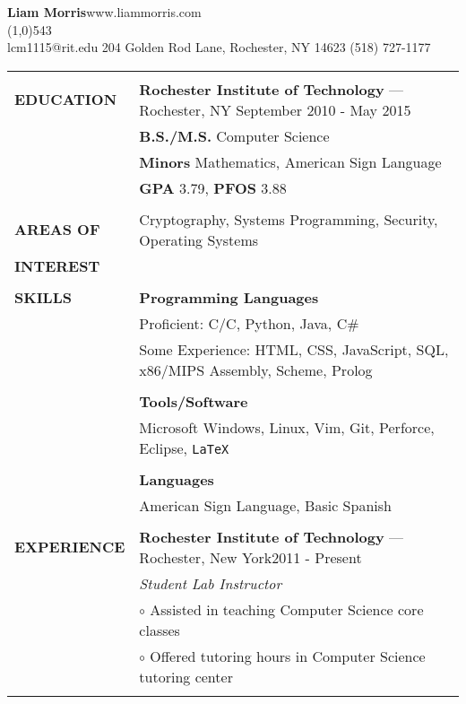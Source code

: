 \documentclass[10pt,letterpaper]{article}
\newcommand{\CPP}
{C\nolinebreak[4]\hspace{-.05em}\raisebox{.22ex}{\footnotesize\bf ++}}
\begin{document}
\raggedright

\textbf{\huge{Liam Morris}}\hfill www.liammorris.com\\
\vspace{-8pt}
\line(1,0){543}\\
lcm1115@rit.edu \hfill 204 Golden Rod Lane, Rochester, NY 14623 \hfill (518)
727-1177\\
\vspace{5pt}

\begin{tabular}{@{}lp{6.6in}}
&\\
\textbf{EDUCATION}
&\textbf{Rochester Institute of Technology} --- Rochester, NY \hfill September 2010 - May 2015\\
&\textbf{B.S./M.S.} Computer Science\\
&\textbf{Minors} Mathematics, American Sign Language\\
&\textbf{GPA} 3.79, \textbf{PFOS} 3.88\\
&\\
\textbf{AREAS OF}
&Cryptography, Systems Programming, Security, Operating Systems\\
\textbf{INTEREST}&\\
&\\
\textbf{SKILLS}
&\textbf{Programming Languages}\\
&Proficient: C/\CPP, Python, Java, C\#\\
&Some Experience: HTML, CSS, JavaScript, SQL, x86/MIPS Assembly, Scheme, Prolog\\
&\\
&\textbf{Tools/Software}\\
&Microsoft Windows, Linux, Vim, Git, Perforce, Eclipse, \texttt{\LaTeX}\\
&\\
&\textbf{Languages}\\
&American Sign Language, Basic Spanish\\
&\\
\textbf{EXPERIENCE}
&\textbf{Rochester Institute of Technology} --- Rochester, New York\hfill 2011 - Present\\
&\emph{Student Lab Instructor}\\
&\hspace{10pt}$\circ$ Assisted in teaching Computer Science core classes\\
&\hspace{10pt}$\circ$ Offered tutoring hours in Computer Science tutoring center\\
&\\

\end{tabular}
\end{document}
